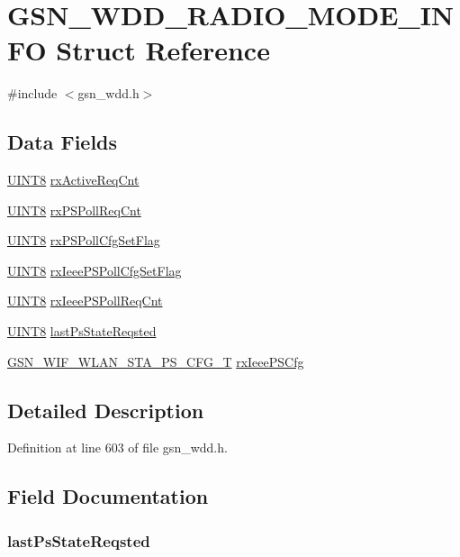 \hypertarget{a00283}{
\section{GSN\_\-WDD\_\-RADIO\_\-MODE\_\-INFO Struct Reference}
\label{a00283}
}


{\ttfamily \#include $<$gsn\_\-wdd.h$>$}

\subsection*{Data Fields}
\begin{DoxyCompactItemize}
\item 
\hyperlink{a00660_gab27e9918b538ce9d8ca692479b375b6a}{UINT8} \hyperlink{a00283_a125a8eaa4e3d225ee2ef6a97c49b1623}{rxActiveReqCnt}
\item 
\hyperlink{a00660_gab27e9918b538ce9d8ca692479b375b6a}{UINT8} \hyperlink{a00283_ae1c83e85aa9154a9e18cc1c67b25eceb}{rxPSPollReqCnt}
\item 
\hyperlink{a00660_gab27e9918b538ce9d8ca692479b375b6a}{UINT8} \hyperlink{a00283_a95f3bbf9ee9798a1df6a44a639127d06}{rxPSPollCfgSetFlag}
\item 
\hyperlink{a00660_gab27e9918b538ce9d8ca692479b375b6a}{UINT8} \hyperlink{a00283_a0a22ab1c8db99c09340bf3a95b81095e}{rxIeeePSPollCfgSetFlag}
\item 
\hyperlink{a00660_gab27e9918b538ce9d8ca692479b375b6a}{UINT8} \hyperlink{a00283_a3b37e1014c34c7ae4be0ee648aa3be61}{rxIeeePSPollReqCnt}
\item 
\hyperlink{a00660_gab27e9918b538ce9d8ca692479b375b6a}{UINT8} \hyperlink{a00283_a0a4ec0bdbd4cdf3511df5e31f1b8eeed}{lastPsStateReqsted}
\item 
\hyperlink{a00403}{GSN\_\-WIF\_\-WLAN\_\-STA\_\-PS\_\-CFG\_\-T} \hyperlink{a00283_a5a308a3717827f3646911070ac15edb3}{rxIeeePSCfg}
\end{DoxyCompactItemize}


\subsection{Detailed Description}


Definition at line 603 of file gsn\_\-wdd.h.



\subsection{Field Documentation}
\hypertarget{a00283_a0a4ec0bdbd4cdf3511df5e31f1b8eeed}{
\subsubsection[{lastPsStateReqsted}]{ {\bf lastPsStateReqsted}}}
\label{a00283_a0a4ec0bdbd4cdf3511df5e31f1b8eeed}


